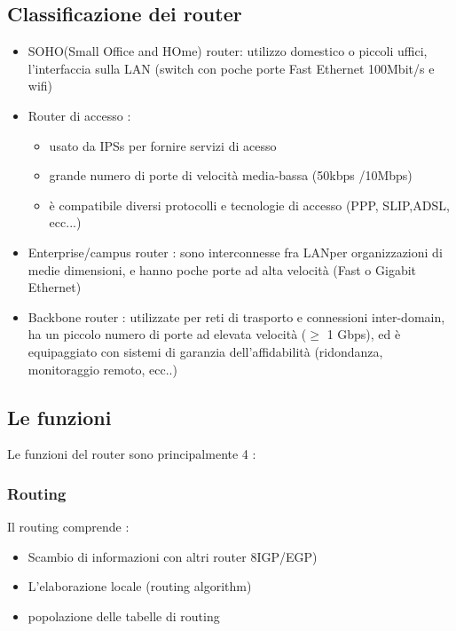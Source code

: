 \documentclass{report}
\begin{document}
            \subsection{Classificazione dei router}
                \begin{itemize}
                    \item SOHO(Small Office and HOme) router:  utilizzo domestico o piccoli uffici, l'interfaccia sulla LAN (switch con poche porte Fast Ethernet 100Mbit/s e wifi)
                    \item Router di accesso : 
                    \begin{itemize}
                        \item usato da IPSs per fornire servizi di acesso
                        \item grande numero di porte di velocità media-bassa (50kbps /10Mbps)
                        \item è compatibile diversi protocolli e tecnologie di accesso (PPP, SLIP,ADSL, ecc...)
                    \end{itemize}
                    \item Enterprise/campus router : sono interconnesse fra LANper organizzazioni di medie dimensioni, e hanno poche porte ad alta velocità (Fast o Gigabit Ethernet)
                    \item Backbone router : utilizzate per reti di trasporto e connessioni inter-domain, ha un piccolo numero di porte ad elevata velocità ($\ge$ 1 Gbps), ed è equipaggiato con sistemi di garanzia dell'affidabilità (ridondanza, monitoraggio remoto, ecc..)
                \end{itemize}
            \subsection{Le funzioni}
                Le funzioni del router sono principalmente 4 :
                \subsubsection{Routing}
                    Il routing comprende :
                    \begin{itemize}
                        \item Scambio di informazioni con altri router 8IGP/EGP)
                        \item L'elaborazione locale (routing algorithm)
                        \item popolazione delle tabelle di routing
                    \end{itemize}
\end{document}
